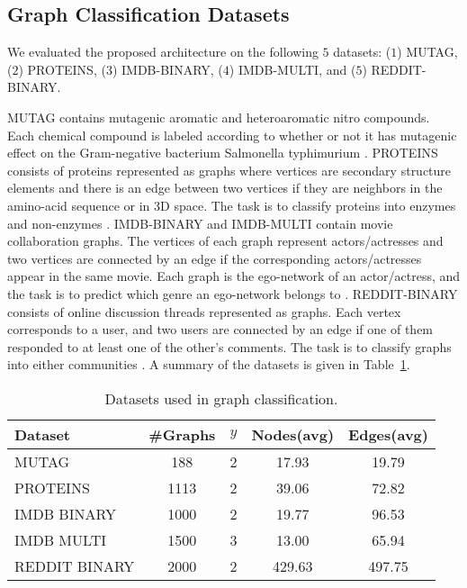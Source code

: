 \documentclass[twoside]{article}
\begin{document}
\subsection{Graph Classification Datasets}
We evaluated the proposed architecture on the following $5$ datasets: ($1$)  MUTAG, ($2$) PROTEINS, ($3$) IMDB-BINARY, ($4$) IMDB-MULTI, and ($5$) REDDIT-BINARY.

MUTAG contains mutagenic aromatic and heteroaromatic nitro compounds.
Each chemical compound is labeled according to whether or not it has mutagenic effect on the Gram-negative bacterium Salmonella typhimurium \citep{debnath1991structure}.
PROTEINS consists of proteins represented as graphs where vertices are secondary structure elements and there is an edge between two vertices if they are neighbors in the amino-acid sequence or in 3D space.
The task is to classify proteins into enzymes and non-enzymes \citep{borgwardt2005protein}.
IMDB-BINARY and IMDB-MULTI contain movie collaboration graphs.
The vertices of each graph represent actors/actresses and two vertices are connected by an edge if the corresponding actors/actresses appear in the same movie.
Each graph is the ego-network of an actor/actress, and the task is to predict which genre an ego-network belongs to \citep{yanardag2015deep}.
REDDIT-BINARY consists of online discussion threads represented as graphs.
Each vertex corresponds to a user, and two users are connected by an edge if one of them responded to at least one of the other's comments.
The task is to classify graphs into either communities \citep{yanardag2015deep}.
A summary of the datasets is given in Table~\ref{tab:datasets_graph_classification}.

\begin{table}[t]
\centering
\caption{Datasets used in graph classification.}
\resizebox{\columnwidth}{!} {
\begin{tabular}{lcccc}
\toprule
 Dataset & \#Graphs & $y$ & Nodes(avg) & Edges(avg) \\
\midrule
MUTAG & 188 & 2 & 17.93 & 19.79 \\
PROTEINS & 1113 & 2 & 39.06 & 72.82 \\
IMDB BINARY & 1000 & 2 & 19.77 & 96.53 \\
IMDB MULTI & 1500 & 3 & 13.00 & 65.94 \\
REDDIT BINARY & 2000 & 2 & 429.63 & 497.75 \\
\bottomrule
\end{tabular}
}
\label{tab:datasets_graph_classification}
\end{table}
\end{document}
